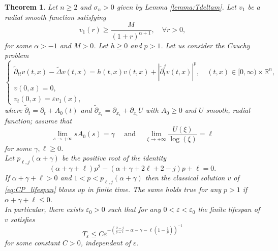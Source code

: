 \documentclass[11pt,reqno]{amsart}
\newtheorem{theorem}{Theorem}
\theoremstyle{definition}
\numberwithin{equation}{section}
\newcommand{\R}{\mathbb{R}}
\newcommand{\eps}{\varepsilon}
\begin{document}
\begin{theorem}\label{thm:lifespan}
Let $n\geq 2$ and $\sigma_n>0$ given by Lemma \ref{lemma:Tdeltam}. Let $v_1$ be a radial smooth function satisfying 
\begin{equation}
    v_1(r)\geq \frac{M}{(1+r)^{\alpha+1}}, \quad \forall r>0,
\end{equation}
for some $\alpha>-1$ and $M>0$. Let $h\geq 0$ and $p>1$. Let us consider the Cauchy problem
%
\begin{equation}
\label{eq:CP_lifespan}
\begin{cases}
\tilde\partial_{tt}v(t,x)- \tilde\Delta v(t,x)=h(t,x)v(t,x)+|\tilde\partial_t^j v(t,x)|^p, \quad (t,x)\in [0,\infty)\times \R^n, \\
v(0,x)=0,&\\
v_t(0,x)= \varepsilon v_1(x),&
\end{cases}
\end{equation}
%
where $\tilde \partial_t=\partial_t+A_0(t)$ and $\tilde\partial_{x_i}=\partial_{x_i}+\partial_{x_i}U$ with  $A_0\geq 0$ and $U$ smooth, radial function; assume that
%
\begin{equation}\label{asmp_thm_lifespan}
\lim_{s\to+\infty}sA_0(s)=\gamma \quad \text{ and } \quad \lim_{\xi\to+\infty}\frac{U(\xi)}{\log(\xi)}=\ell
\end{equation}
%
for some $\gamma,\ell \geq 0$. 
\\ Let $p_{\ell,j}(\alpha+\gamma)$ be the positive root of the identity
\begin{equation}
(\alpha+\gamma+\ell)p^2-(\alpha+\gamma+2\ell+2-j)p+\ell=0.
\end{equation}
%
If $\alpha+\gamma+\ell>0$ and $1<p<p_{\ell,j}(\alpha+\gamma)$ then the classical solution $v$ of \eqref{eq:CP_lifespan}
blows up in finite time.
The same holds true for any $p>1$ if $\alpha+\gamma+\ell\leq 0$. \\
%
In particular, there exists $\eps_0>0$ such that for any $0<\eps<\eps_0$ the finite lifespan of $v$ satisfies
%
\begin{equation*}
T_\eps\leq  C \eps^{-\left(\frac{2-j}{p-1}-\alpha-\gamma-\ell\left(1-\frac{1}{p}\right)\right)^{-1}}
\end{equation*}
%
for some constant $C>0$, independent of $\eps$.
\end{theorem}

\noindent 
\end{document}
